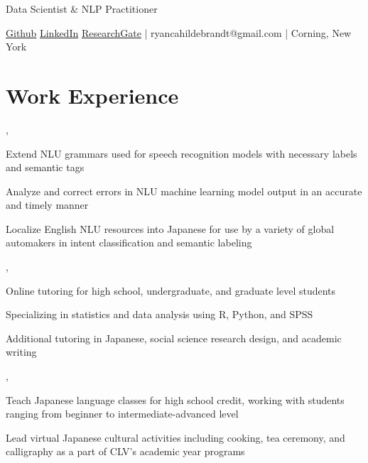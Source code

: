 \documentclass[letterpaper]{deedy-resume_sm}
\begin{document}
\lastupdated %

\leavevmode

\sectionspace
\leavevmode
Data Scientist \& NLP Practitioner
\leavevmode

\href{https://github.com/ryancahildebrandt}{Github}
\href{https://linkedin.com/in/rcah}{LinkedIn}
\href{https://researchgate.net/profile/Ryan-Hildebrandt}{ResearchGate}
 | ryancahildebrandt@gmail.com | Corning, New York

\sectionspace

\section{Work Experience}
, 
\begin{tightitemize}
\item Extend NLU grammars used for speech recognition models with necessary labels and semantic tags
\item Analyze and correct errors in NLU machine learning model output in an accurate and timely manner
\item Localize English NLU resources into Japanese for use by a variety of global automakers in intent classification and semantic labeling
\end{tightitemize}
\sectionspace

, 
\begin{tightitemize}
\item Online tutoring for high school, undergraduate, and graduate level students
\item Specializing in statistics and data analysis using R, Python, and SPSS
\item Additional tutoring in Japanese, social science research design, and academic writing
\end{tightitemize}
\sectionspace

, 
\begin{tightitemize}
\item Teach Japanese language classes for high school credit, working with students ranging from beginner to intermediate-advanced level
\item Lead virtual Japanese cultural activities including cooking, tea ceremony, and calligraphy as a part of CLV's academic year programs
\end{tightitemize}
\sectionspace
\end{document}
